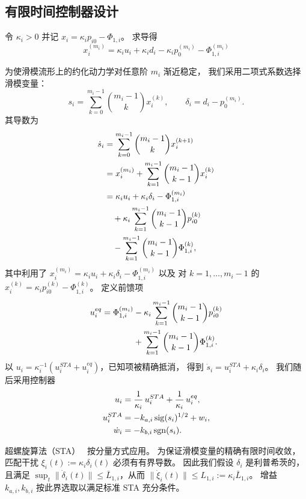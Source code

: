 \subsection{有限时间控制器设计}

令 $\kappa_i>0$ 并记 $x_i=\kappa_i p_{i0}-\Phi_{1,i}$。
求导得
\begin{equation}
    x_i^{(m_i)}=\kappa_i  u_i+ \kappa_i  d_i- \kappa_i p_0^{(m_i)} - \Phi_{1,i}^{(m_i)}
\end{equation}

为使滑模流形上的约化动力学对任意阶 $m_i$ 渐近稳定，
我们采用二项式系数选择滑模变量：
\begin{equation}
    s_i=\sum_{k=0}^{m_i-1}\binom{m_i-1}{k}x_i^{(k)},
    \qquad \delta_i=d_i-p_0^{(m_i)}.
\end{equation}
其导数为
\begin{align}
\dot{s}_i
&= \sum_{k=0}^{m_i-1}\binom{m_i-1}{k}x_i^{(k+1)} \notag\\
&= x_i^{(m_i)}
   +\sum_{k=1}^{m_i-1}\binom{m_i-1}{k-1}x_i^{(k)}\\
&= \kappa_i  u_i+\kappa_i  \delta_i-\Phi_{1,i}^{(m_i)} \notag\\
&\quad
   +\kappa_i \sum_{k=1}^{m_i-1}\binom{m_i-1}{k-1}p_{i0}^{(k)}
   \notag\\
&\quad
   -\sum_{k=1}^{m_i-1}\binom{m_i-1}{k-1}\Phi_{1,i}^{(k)},
\end{align}
其中利用了 $x_i^{(m_i)}=\kappa_i u_i+\kappa_i\delta_i-\Phi_{1,i}^{(m_i)}$ 以及
对 $k=1,\dots,m_i-1$ 的 $x_i^{(k)}=\kappa_i p_{i0}^{(k)}-\Phi_{1,i}^{(k)}$。
定义前馈项
\begin{align}
    u_i^{eq}= \Phi_{1,i}^{(m_i)}
    &-\kappa_i\sum_{k=1}^{m_i-1}\binom{m_i-1}{k-1}p_{i0}^{(k)}
    \notag\\
    &+\sum_{k=1}^{m_i-1}\binom{m_i-1}{k-1}\Phi_{1,i}^{(k)}.
\end{align}
以 $u_i=\kappa_i^{-1}(u_i^{STA}+u_i^{eq})$，已知项被精确抵消，
得到 $\dot{s}_i=u_i^{STA}+\kappa_i\delta_i$。
我们随后采用控制器
\begin{align}
    u_i & =\frac{1}{\kappa_i}\,u_i^{STA}+\frac{1}{\kappa_i}\,u_i^{eq},\\
    u_i^{STA}& =-k_{a,i} \operatorname{sig}(s_i)^{1/2} + w_i,\\
    \dot{w}_i& =-k_{b,i} \operatorname{sgn}(s_i).
\end{align}

超螺旋算法（STA）~\cite{seeberStabilityProofWellestablished2017}
按分量方式应用。
为保证滑模变量的精确有限时间收敛，匹配干扰
$\xi_i(t):=\kappa_i\delta_i(t)$ 必须有有界导数。
因此我们假设 $\delta_i$ 是利普希茨的，且满足
$\sup_t\|\dot\delta_i(t)\|\le \bar L_{1,i}$，从而
$\|\dot\xi_i(t)\|\le L_{1,i}:=\kappa_i\bar L_{1,i}$。
增益 $k_{a,i},k_{b,i}$ 按此界选取以满足标准 STA 充分条件。

